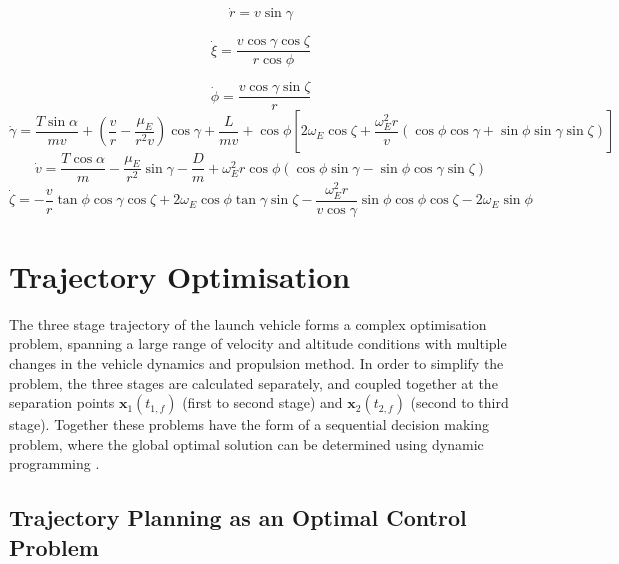 \documentclass[]{aiaa-tc}
\begin{document}
\begin{equation}
\dot{r} = v \sin \gamma
\end{equation}

\begin{equation}
\dot{\xi} = \frac{v\cos \gamma \cos \zeta}{r \cos \phi}
\end{equation}

\begin{equation}
\dot{\phi} = \frac{v\cos\gamma\sin\zeta}{r}
\end{equation}
\begin{equation}
\dot{\gamma} = \frac{T\sin\alpha}{mv}+ (\frac{v}{r}-\frac{\mu_E}{r^2 v})\cos\gamma + \frac{L}{mv}
 + \cos\phi[2\omega_E \cos\zeta + \frac{\omega_E^2 r}{v}(\cos\phi\cos\gamma+\sin\phi\sin\gamma\sin\zeta)]
 \end{equation}
\begin{equation}
\dot{v} = \frac{T\cos\alpha}{m}-\frac{\mu_E}{r^2}\sin\gamma - \frac{D}{m}
+ \omega_E^2 r\cos\phi(\cos\phi\sin\gamma-\sin\phi\cos\gamma\sin\zeta)
\end{equation}
\begin{equation}
\dot{\zeta} = -\frac{v}{r}\tan\phi\cos\gamma\cos\zeta +2\omega_E\cos\phi\tan\gamma\sin\zeta - \frac{\omega_E^2 r}{v\cos\gamma}\sin\phi\cos\phi\cos\zeta-2\omega_E\sin\phi 
\end{equation}


\section{Trajectory Optimisation} \label{section:optimisation}

The three stage trajectory of the launch vehicle forms a complex optimisation problem, spanning a large range of velocity and altitude conditions with multiple changes in the vehicle dynamics and propulsion method. In order to simplify the problem, the three stages are calculated separately, and coupled together at the separation points $\textbf{x}_1(t_{1,f})$ (first to second stage) and  $\textbf{x}_2(t_{2,f})$ (second to third stage). Together these problems have the form of a sequential decision making problem, where the global optimal solution can be determined using dynamic programming \cite{Bertsekas2005}. 



\subsection{Trajectory Planning as an Optimal Control Problem}
\end{document}
